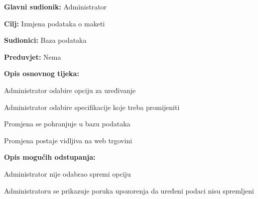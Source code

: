 					
					\noindent {}
					\begin{packed_item}
						
						\item \textbf{Glavni sudionik: } Administrator
						\item  \textbf{Cilj:} Izmjena podataka o maketi
						\item  \textbf{Sudionici:} Baza podataka
						\item  \textbf{Preduvjet:} Nema
						\item  \textbf{Opis osnovnog tijeka:}
						
						\item[] \begin{packed_enum}
							
							\item Administrator odabire opciju za uređivanje
							\item Administrator odabire specifikacije koje treba promijeniti
							\item Promjena se pohranjuje u bazu podataka
							\item Promjena postaje vidljiva na web trgovini
						\end{packed_enum}
						\item  \textbf{Opis mogućih odstupanja:}
						
						\item[] \begin{packed_item}
							
							\item[2.a] Administrator nije odabrao spremi opciju
							
							\item[] \begin{packed_enum}
								
								\item Administratoru se prikazuje poruka upozorenja da uređeni podaci nisu spremljeni
								
							\end{packed_enum}
							
						\end{packed_item}
					\end{packed_item}
				

